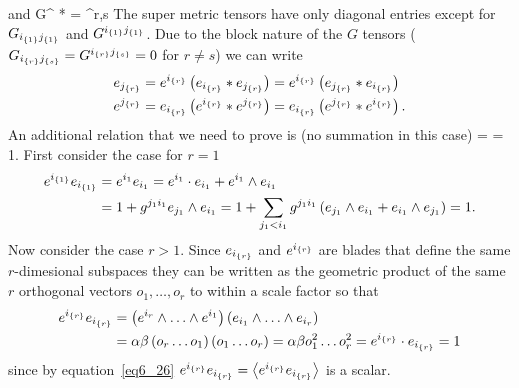 \ee
and
\be
	G^{} \equiv {}* = \delta^{r,s}
\ee
The super metric tensors have only diagonal entries except for $G_{{i}_{\left \{{1}\right \}}{j}_{\left \{{1}\right \}}}$ and $G^{{i}_{\left \{{1}\right \}}{j}_{\left \{{1}\right \}}}$.  Due to the block nature of
the $G$ tensors ($G_{{i}_{\left \{{r}\right \}}{j}_{\left \{{s}\right \}}} = G^{{i}_{\left \{{r}\right \}}{j}_{\left \{{s}\right \}}} = 0$ for $r\ne s$) we can write
\begin{align}
	e_{{j}_{\left \{{r}\right \}}} &= e^{{i}_{\left \{{r}\right \}}}\left ( {e_{{i}_{\left \{{r}\right \}}}*e_{{j}_{\left \{{r}\right \}}}} \right ) = e^{{i}_{\left \{{r}\right \}}}\left ( {e_{{j}_{\left \{{r}\right \}}}*e_{{i}_{\left \{{r}\right \}}}} \right ) \\
	e^{{j}_{\left \{{r}\right \}}} &= e_{{i}_{\left \{{r}\right \}}}\left ( {e^{{i}_{\left \{{r}\right \}}}*e^{{j}_{\left \{{r}\right \}}}} \right ) = e_{{i}_{\left \{{r}\right \}}}\left ( {e^{{j}_{\left \{{r}\right \}}}*e^{{i}_{\left \{{r}\right \}}}} \right ).
\end{align} 
An additional relation that we need to prove is (no summation in this case)
\be
	 = \cdot{} = 1.
\ee
First consider the case for $r=1$
\begin{align}
	e^{{i}_{\left \{{1}\right \}}}e_{{i}_{\left \{{1}\right \}}} &= e^{i_{1}}e_{i_{1}} =  e^{i_{1}}\cdot e_{i_{1}}+e^{i_{1}}\wedge e_{i_{1}} \nonumber \\
	                   &= 1+g^{j_{1}i_{1}}e_{j_{1}}\wedge  e_{i_{1}} = 1+\sum_{j_{1}<i_{1}} g^{j_{1}i_{1}}\left ( {e_{j_{1}}\wedge  e_{i_{1}}+e_{i_{1}}\wedge  e_{j_{1}}} \right )  = 1.                
\end{align}
Now consider the case $r>1$.  Since $e_{{i}_{\left \{{r}\right \}}}$ and $e^{{i}_{\left \{{r}\right \}}}$ are blades that define the same $r$-dimesional subspaces they can be written as the geometric
product of the same $r$ orthogonal vectors $o_{1},\dots,o_{r}$ to within a scale factor so that
\begin{align}
	\eu{i}{r}\ed{i}{r} &= \paren{e^{i_{r}}\W\dots\W e^{i_{1}}}\paren{e_{i_{1}}\W\dots\W e_{i_{r}}} \nonumber \\
	                   &= \alpha\beta\paren{o_{r}\dots o_{1}}\paren{o_{1}\dots o_{r}} = \alpha\beta o_{1}^{2}\dots o_{r}^{2} = \eu{i}{r}\cdot\ed{i}{r} =1 \label{eq6_26}
\end{align}
since by equation~\ref{eq6_26} $e^{{i}_{\left \{{r}\right \}}}e_{{i}_{\left \{{r}\right \}}} = \left \langle {e^{{i}_{\left \{{r}\right \}}}e_{{i}_{\left \{{r}\right \}}}} \right \rangle_{}$ is a scalar.
